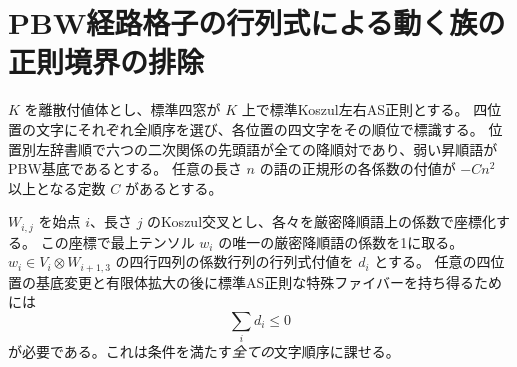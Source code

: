 \section{PBW経路格子の行列式による動く族の正則境界の排除}
\label{sec:pbw-valuative-boundaries}
\begin{theorem}\label{thm:pbw-valuative-boundaries}
$K$ を離散付値体とし、標準四窓が $K$ 上で標準Koszul左右AS正則とする。
四位置の文字にそれぞれ全順序を選び、各位置の四文字をその順位で標識する。
位置別左辞書順で六つの二次関係の先頭語が全ての降順対であり、弱い昇順語がPBW基底であるとする。
任意の長さ $n$ の語の正規形の各係数の付値が $-Cn^2$ 以上となる定数 $C$ があるとする。

$W_{i,j}$ を始点 $i$、長さ $j$ のKoszul交叉とし、各々を厳密降順語上の係数で座標化する。
この座標で最上テンソル $w_i$ の唯一の厳密降順語の係数を1に取る。
$w_i\in V_i\otimes W_{i+1,3}$ の四行四列の係数行列の行列式付値を $d_i$ とする。
任意の四位置の基底変更と有限体拡大の後に標準AS正則な特殊ファイバーを持ち得るためには
\[
                         \sum_i d_i\le0
\]
が必要である。これは条件を満たす\emph{全ての}文字順序に課せる。
\end{theorem}
